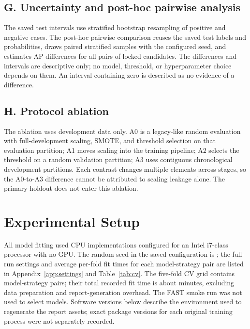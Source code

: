\documentclass[journal]{IEEEtran}
\begin{document}
\subsection{G. Uncertainty and post-hoc pairwise analysis}
The saved test intervals use stratified bootstrap resampling of positive and negative cases. The post-hoc pairwise comparison reuses the saved test labels and probabilities, draws \BootstrapReplicates{} paired stratified samples with the configured seed, and estimates AP differences for all pairs of locked candidates. The differences and intervals are descriptive only; no model, threshold, or hyperparameter choice depends on them. An interval containing zero is described as no evidence of a difference.

\subsection{H. Protocol ablation}
The ablation uses development data only. A0 is a legacy-like random evaluation with full-development scaling, SMOTE, and threshold selection on that evaluation partition; A1 moves scaling into the training pipeline; A2 selects the threshold on a random validation partition; A3 uses contiguous chronological development partitions. Each contrast changes multiple elements across stages, so the A0-to-A3 difference cannot be attributed to scaling leakage alone. The primary holdout does not enter this ablation.
\FloatBarrier

\section{Experimental Setup}
\label{sec:setup}
All model fitting used CPU implementations configured for an Intel i7-class processor with no GPU. The random seed in the saved configuration is \SeedValue{}; the full-run settings and average per-fold fit times for each model-strategy pair are listed in Appendix~\ref{app:settings} and Table~\ref{tab:cv}. The five-fold CV grid contains \CVPairCount{} model-strategy pairs; their total recorded fit time is about \CVTotalFitMinutes{} minutes, excluding data preparation and report-generation overhead. The FAST smoke run was not used to select models. Software versions below describe the environment used to regenerate the report assets; exact package versions for each original training process were not separately recorded.

\begin{table}[!t]
\centering
\caption{Software versions in the report-build environment.}
\label{tab:software}

\end{table}
\end{document}
